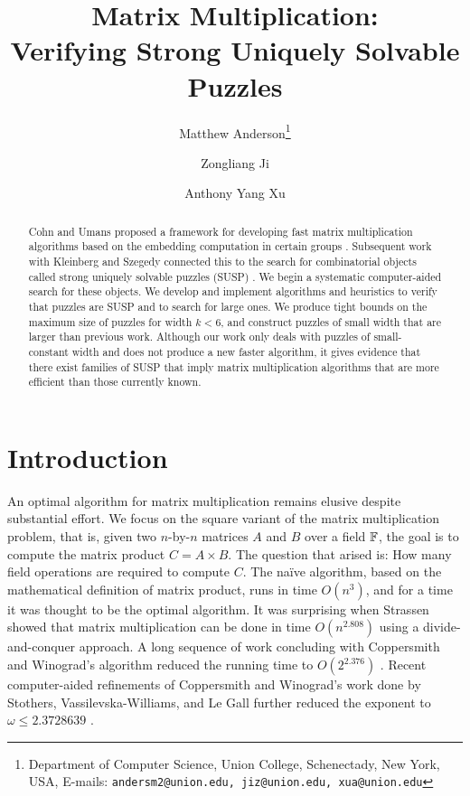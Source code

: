 \documentclass[11pt]{article}
\date{}
\title{Matrix Multiplication: \\Verifying Strong Uniquely Solvable Puzzles
{\IfFileExists{./sha.tex}{\\\small SHA: }{}}}
\author{
Matthew Anderson\thanks{Department of Computer Science, Union College, Schenectady, New York, USA, E-mails: \texttt{andersm2@union.edu, jiz@union.edu, xua@union.edu}}%
\and%
Zongliang Ji\samethanks[1]
\and%
Anthony Yang Xu\samethanks[1]
}
\begin{document}
\maketitle

\begin{abstract}
Cohn and Umans proposed a framework for developing fast matrix
multiplication algorithms based on the embedding computation in
certain groups \cite{cu03}.  Subsequent work with Kleinberg and
Szegedy connected this to the search for combinatorial objects called
strong uniquely solvable puzzles (SUSP) \cite{cksu05}.  We begin a
systematic computer-aided search for these objects.  We develop and
implement algorithms and heuristics to verify that puzzles are SUSP
and to search for large ones.  We produce tight bounds on the maximum
size of puzzles for width $k < 6$, and construct puzzles of small
width that are larger than previous work.  Although our work only
deals with puzzles of small-constant width and does not produce a new
faster algorithm, it gives evidence that there exist families of SUSP
that imply matrix multiplication algorithms that are more efficient
than those currently known.
\end{abstract}

\thispagestyle{empty}
\newpage
{}


\section{Introduction}
\label{sec:intro}


An optimal algorithm for matrix multiplication remains elusive
despite substantial effort.  We focus on the square variant of the
matrix multiplication problem, that is, given two $n$-by-$n$ matrices
$A$ and $B$ over a field $\F$, the goal is to compute the matrix
product $C = A \times B$.  The question that arised is: How many field
operations are required to compute $C$.  The na\"{i}ve algorithm,
based on the mathematical definition of matrix product, runs in time
$O(n^3)$, and for a time it was thought to be the optimal algorithm.
It was surprising when Strassen showed that matrix multiplication can
be done in time $O(n^{2.808})$ \cite{str69} using a
divide-and-conquer approach.  A long sequence of work concluding with
Coppersmith and Winograd's algorithm reduced the running time
to $O(2^{2.376})$ \cite{pan78,bcrl79,sch81,cw82,str86,cw90}. Recent
computer-aided refinements of Coppersmith and Winograd's work done by
Stothers, Vassilevska-Williams, and Le Gall further reduced the
exponent to $\omega \le 2.3728639$ \cite{ds13,wil12,le14}.
\end{document}
